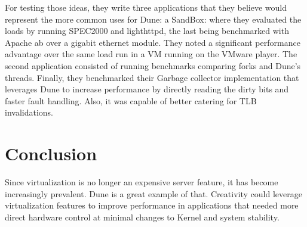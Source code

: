 \documentclass[12pt]{article}
\begin{document}
For testing those ideas, they write three applications that they believe would represent the more common uses for Dune: a SandBox: where they evaluated the loads by running SPEC2000 and lighthttpd, the last being benchmarked with Apache ab over a gigabit ethernet module. They noted a significant performance advantage over the same load run in a VM running on the VMware player. The second application consisted of running benchmarks comparing forks and Dune's threads. Finally, they benchmarked their Garbage collector implementation that leverages Dune to increase performance by directly reading the dirty bits and faster fault handling. Also, it was capable of better catering for TLB invalidations.

\section{Conclusion}
Since virtualization is no longer an expensive server feature, it has become increasingly prevalent. Dune is a great example of that. Creativity could leverage virtualization features to improve performance in applications that needed more direct hardware control at minimal changes to Kernel and system stability.


\end{document}
